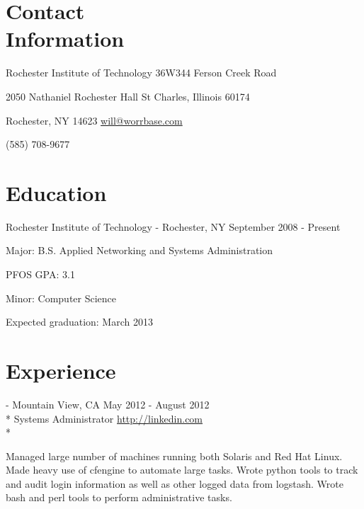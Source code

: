 \documentclass[letter,margin,line]{resume}
\newcommand{\rurl}[1]{\hfill {\footnotesize \url{#1}}}
\newcommand{\rdate}[1]{\hfill {\small #1}}
\renewcommand{\employer}[5]{\item[#1] - #2 \rdate{#3} \\* #4 \rurl{#5} \\*}
\begin{document}
\begin{resume}
\section{\mysidestyle Contact \\ Information} \vspace{2mm}
	\begin{asparablank}
		\item Rochester Institute of Technology \hfill 36W344 Ferson Creek Road
		\item 2050 Nathaniel Rochester Hall \hfill St Charles, Illinois 60174
		\item Rochester, NY 14623 \hfill
		\href{mailto:will@worrbase.com}{will@worrbase.com}
		\item (585) 708-9677 \hfill
	\end{asparablank}

\section{\mysidestyle Education}
	\begin{compactdesc}
		\item[Rochester Institute of Technology] - Rochester, NY \rdate{September 2008 - Present}
		\begin{compactitem} { \small
			\item Major: B.S. Applied Networking and Systems Administration
			\item PFOS GPA: 3.1
			\item Minor: Computer Science
			\item Expected graduation: March 2013
		} \end{compactitem}
	\end{compactdesc}

\section{\mysidestyle Experience}
	\begin{asparadesc}
		\employer{LinkedIn}{Mountain View, CA}{May 2012 - August 2012}{Systems Administrator}{http://linkedin.com}

		\small
		Managed large number of machines running both Solaris and Red Hat Linux. Made heavy use of cfengine
		to automate large tasks. Wrote python tools to track and audit login information
		as well as other logged data from logstash. Wrote bash and perl tools to perform administrative tasks.
		\normalsize
		\\


\end{asparadesc}
\end{resume}
\end{document}
